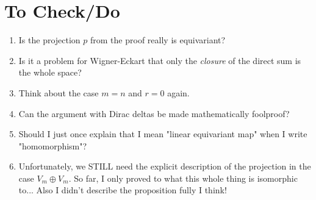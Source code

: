 \documentclass[12pt, a4paper]{article}
\theoremstyle{plain}
\theoremstyle{definition}
\theoremstyle{remark}
\begin{document}
\section{To Check/Do}

\begin{enumerate}
\item Is the projection $p$ from the proof really is equivariant?
\item Is it a problem for Wigner-Eckart that only the \emph{closure} of the direct sum is the whole space?
\item Think about the case $m = n$ and $r = 0$ again.
\item Can the argument with Dirac deltas be made mathematically foolproof?
\item Should I just once explain that I mean "linear equivariant map" when I write "homomorphism"?
\item Unfortunately, we STILL need the explicit description of the projection in the case $V_m \oplus V_m$. So far, I only proved to what this whole thing is isomorphic to... Also I didn't describe the proposition fully I think!
\end{enumerate}









 





\end{document}
